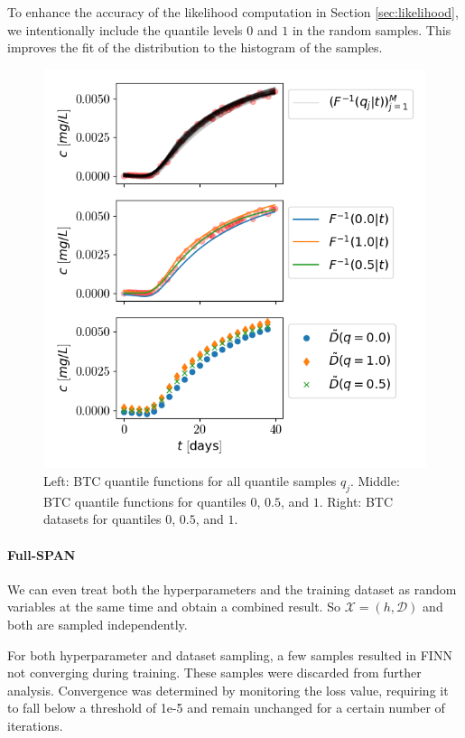 To enhance the accuracy of the likelihood computation in Section \vref{sec:likelihood}, we intentionally include the quantile levels $0$ and $1$ in the random samples. This improves the fit of the distribution to the histogram of the samples.

\begin{figure}[h]
    \centering
    \includegraphics{figs/btc_dataspan_quantiles.png}
    \caption{Left: BTC quantile functions for all quantile samples $q_j$. Middle: BTC quantile functions for quantiles $0$, $0.5$, and $1$. Right: BTC datasets for quantiles $0$, $0.5$, and $1$.}
    \label{fig:btc_dataspan_quantiles}
\end{figure}



\paragraph{Full-SPAN}

We can even treat both the hyperparameters and the training dataset as random variables at the same time and obtain a combined result. So $\mathcal{X} = (h, \mathcal{D})$ and both are sampled independently.

For both hyperparameter and dataset sampling, a few samples resulted in FINN not converging during training. These samples were discarded from further analysis. Convergence was determined by monitoring the loss value, requiring it to fall below a threshold of 1e-5 and remain unchanged for a certain number of iterations.


